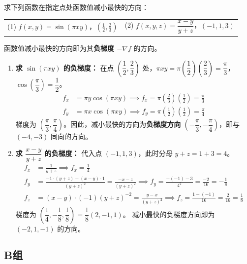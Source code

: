 \documentclass[lang=cn,11pt]{elegantbook}
\begin{document}
\begin{exercise}[最速下降方向求解]
求下列函数在指定点处函数值减小最快的方向：\\
\begin{tabular}{p{} p{}}
(1) $f(x,y)=\sin(\pi xy)$，$\left(\frac{1}{2},\frac{2}{3}\right)$ & (2) $f(x,y,z)=\dfrac{x-y}{y+z}$，$(-1,1,3)$
\end{tabular}
\end{exercise}

\begin{solution}
函数值减小最快的方向即为其\textbf{负梯度 $-\nabla f$} 的方向。
\begin{enumerate}
  \item[(1)] \textbf{求 $\sin(\pi xy)$ 的负梯度：}
  在点 $\left(\dfrac{1}{2},\dfrac{2}{3}\right)$ 处，$\pi xy = \pi\left(\dfrac{1}{2}\right)\left(\dfrac{2}{3}\right) = \dfrac{\pi}{3}$，$\cos\left(\dfrac{\pi}{3}\right) = \dfrac{1}{2}$。
  \begin{align*}
  f_x &= \pi y\cos(\pi xy) \implies f_x = \pi\left(\frac{2}{3}\right)\left(\frac{1}{2}\right) = \frac{\pi}{3} \\
  f_y &= \pi x\cos(\pi xy) \implies f_y = \pi\left(\frac{1}{2}\right)\left(\frac{1}{2}\right) = \frac{\pi}{4}
  \end{align*}
  梯度为 $\left(\dfrac{\pi}{3}, \dfrac{\pi}{4}\right)$。因此，减小最快的方向为\textbf{负梯度方向 $\left(-\dfrac{\pi}{3}, -\dfrac{\pi}{4}\right)$}，即与 $(-4, -3)$ 同向的方向。

  \item[(2)] \textbf{求 $\dfrac{x-y}{y+z}$ 的负梯度：}
  代入点 $(-1, 1, 3)$，此时分母 $y+z = 1+3 = 4$。
  \begin{align*}
  f_x &= \frac{1}{y+z} \implies f_x = \frac{1}{4} \\
  f_y &= \frac{-1\cdot(y+z) - (x-y)\cdot 1}{(y+z)^2} = \frac{-x-z}{(y+z)^2} \implies f_y = \frac{-(-1)-3}{4^2} = \frac{-2}{16} = -\frac{1}{8} \\
  f_z &= (x-y)\cdot(-1)(y+z)^{-2} = \frac{y-x}{(y+z)^2} \implies f_z = \frac{1-(-1)}{16} = \frac{2}{16} = \frac{1}{8}
  \end{align*}
  梯度为 $\left(\dfrac{1}{4}, -\dfrac{1}{8}, \dfrac{1}{8}\right) = \dfrac{1}{8}(2, -1, 1)$。
  减小最快的负梯度方向即为 \textbf{$(-2, 1, -1)$} 的方向。
\end{enumerate}
\end{solution}

\subsection{B组}
\end{document}
